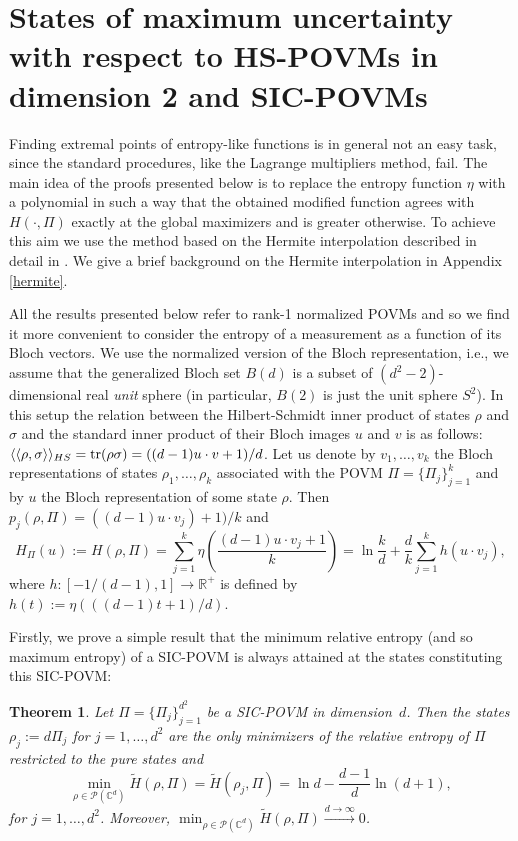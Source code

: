 \documentclass[11pt]{article}
\newtheorem{Th}{Theorem}
\theoremstyle{remark}
\theoremstyle{definition}
\def\tr{\textnormal{tr}}
\begin{document}
\section{States of maximum uncertainty with respect to HS-POVMs in dimension 2 and SIC-POVMs}

Finding extremal points of entropy-like functions is in general not an easy task, since the standard procedures, like the Lagrange multipliers method, fail. The main idea of the proofs presented below is to replace the entropy function $\eta$ with a polynomial in such a way that the obtained modified function agrees with $H(\cdot,\Pi)$ exactly at the global maximizers and is greater otherwise. To achieve this aim we use the method based on the Hermite interpolation described in detail in \cite{SloSzy16}. We give a brief background on the Hermite interpolation in  Appendix \ref{hermite}.

All the results presented below refer to rank-1 normalized POVMs and so we find it more convenient to consider the entropy of a measurement as a function of its Bloch vectors. We use the normalized version of the Bloch representation, i.e., we assume that the generalized Bloch set $B(d)$ is a subset of $(d^2-2)$-dimensional real \emph{unit} sphere (in particular, $B(2)$ is just the unit sphere $S^2$). In this setup the relation between the Hilbert-Schmidt inner product of states $\rho$ and $\sigma$ and the standard inner product of their Bloch images $u$ and $v$ is as follows: $\langle\langle\rho,\sigma\rangle\rangle_{HS}=\tr(\rho\sigma)=((d-1)u\cdot v+1)/d$. Let us denote by $v_1,\ldots,v_k$ the Bloch representations of states $\rho_1,\ldots,\rho_k$ associated with the POVM $\Pi=\{\Pi_j\}_{j=1}^k$ and by $u$ the Bloch representation of some state $\rho$. Then $p_j(\rho,\Pi)=((d-1)u\cdot v_j)+1)/k$ and
\begin{equation}\label{entropyBloch}
H_{\Pi}(u):=H(\rho,\Pi)=\sum_{j=1}^k\eta\left(\frac{(d-1)u\cdot v_j+1}{k}\right)=\ln\frac{k}{d}+\frac{d}{k}\sum_{j=1}^k h(u\cdot v_j),
\end{equation}
where $h:[-1/(d-1),1]\to\mathbb R^+$ is defined by $h(t):=\eta(((d-1)t+1)/d)$.



Firstly, we prove a simple result that the minimum relative entropy (and so maximum entropy) of a SIC-POVM is always attained at the states constituting this SIC-POVM: 

\begin{Th}\label{maxsic}
	Let  $\Pi=\{\Pi_j\}_{j=1}^{d^2}$ be a SIC-POVM in dimension~$d$. Then the states $\rho_j:=d\Pi_j$ for $j=1,\ldots,d^2$ are the only minimizers of the relative entropy of $\Pi$ restricted to the pure states and
	\begin{equation}\label{sicbound}
	\min_{\rho\in\mathcal P(\mathbb C^d)}\widetilde H(\rho,\Pi)=\widetilde H(\rho_j,\Pi)=\ln d-\frac{d-1}{d}\ln(d+1),
	\end{equation}
	for $j=1,\ldots,d^2$. Moreover,  $\min_{\rho\in\mathcal P(\mathbb C^d)}\widetilde H(\rho,\Pi)\xrightarrow{d\to\infty} 0$.
\end{Th}
\end{document}
